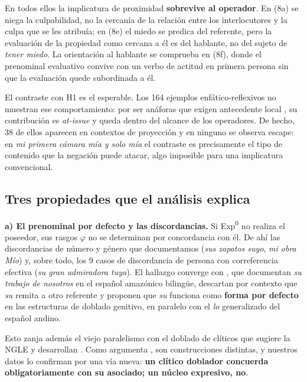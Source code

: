 \documentclass[12pt,a4paper]{article}
\begin{document}
En todos ellos la implicatura de proximidad \textbf{sobrevive al operador}. En (8a) se niega la culpabilidad, no la cercanía de la relación entre los interlocutores y la culpa que se les atribuía; en (8e) el miedo se predica del referente, pero la evaluación de la propiedad como cercana a él es del hablante, no del sujeto de \textit{tener miedo}. La orientación al hablante se comprueba en (8f), donde el prenominal evaluativo convive con un verbo de actitud en primera persona sin que la evaluación quede subordinada a él.

El contraste con H1 es el esperable. Los 164 ejemplos enfático-reflexivos no muestran ese comportamiento: por ser anáforas que exigen antecedente local \parencite{eguren2023}, su contribución es \textit{at-issue} y queda dentro del alcance de los operadores. De hecho, 38 de ellos aparecen en contextos de proyección y en ninguno se observa escape: en \textit{mi primera cámara mía y solo mía} el contraste es precisamente el tipo de contenido que la negación puede atacar, algo imposible para una implicatura convencional.

\subsection{Tres propiedades que el análisis explica}

\textbf{a) El prenominal por defecto y las discordancias.} Si Exp\textsuperscript{0} no realiza el poseedor, sus rasgos $\varphi$ no se determinan por concordancia con él. De ahí las discordancias de número y género que documentamos (\textit{sus zapatos suyo}, \textit{mi obra Mío}) y, sobre todo, los 9 casos de discordancia de persona con correferencia efectiva (\textit{su gran admiradora tuya}). El hallazgo converge con \textcite{rodriguezmondonedofafulas2016}, que documentan \textit{su trabajo de nosotros} en el español amazónico bilingüe, descartan por contexto que \textit{su} remita a otro referente y proponen que \textit{su} funciona como \textbf{forma por defecto} en las estructuras de doblado genitivo, en paralelo con el \textit{lo} generalizado del español andino.

Esto zanja además el viejo paralelismo con el doblado de clíticos que sugiere la NGLE y desarrollan \textcite{companycompanyhuertaflores2017}. Como argumenta \textcite{eguren2019}, son construcciones distintas, y nuestros datos lo confirman por una vía nueva: \textbf{un clítico doblador concuerda obligatoriamente con su asociado; un núcleo expresivo, no}.
\end{document}
